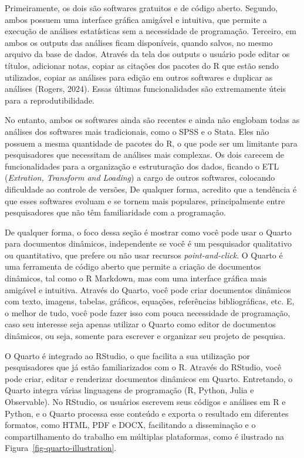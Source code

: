 \documentclass[
  a4paper,
]{article}
\begin{document}
Primeiramente, os dois são softwares gratuitos e de código aberto.
Segundo, ambos possuem uma interface gráfica amigável e intuitiva, que
permite a execução de análises estatísticas sem a necessidade de
programação. Terceiro, em ambos os outputs das análises ficam
disponíveis, quando salvos, no mesmo arquivo da base de dados. Através
da tela dos outputs o usuário pode editar os títulos, adicionar notas,
copiar as citações dos pacotes do R que estão sendo utilizados, copiar
as análises para edição em outros softwares e duplicar as análises
(Rogers, 2024). Essas últimas funcionalidades são extremamente úteis
para a reprodutibilidade.

No entanto, ambos os softwares ainda são recentes e ainda não englobam
todas as análises dos softwares mais tradicionais, como o SPSS e o
Stata. Eles não possuem a mesma quantidade de pacotes do R, o que pode
ser um limitante para pesquisadores que necessitam de análises mais
complexas. Os dois carecem de funcionalidades para a organização e
estruturação dos dados, ficando o ETL (\emph{Extration, Transform and
Loading}) a cargo de outros softwares, colocando dificuldade ao controle
de versões, De qualquer forma, acredito que a tendência é que esses
softwares evoluam e se tornem mais populares, principalmente entre
pesquisadores que não têm familiaridade com a programação.

De qualquer forma, o foco dessa seção é mostrar como você pode usar o
Quarto para documentos dinâmicos, independente se você é um pesquisador
qualitativo ou quantitativo, que prefere ou não usar recursos
\emph{point-and-click}. O Quarto é uma ferramenta de código aberto que
permite a criação de documentos dinâmicos, tal como o R Markdown, mas
com uma interface gráfica mais amigável e intuitiva. Através do Quarto,
você pode criar documentos dinâmicos com texto, imagens, tabelas,
gráficos, equações, referências bibliográficas, etc. E, o melhor de
tudo, você pode fazer isso com pouca necessidade de programação, caso
seu interesse seja apenas utilizar o Quarto como editor de documentos
dinâmicos, ou seja, somente para escrever e organizar seu projeto de
pesquisa.

O Quarto é integrado ao RStudio, o que facilita a sua utilização por
pesquisadores que já estão familiarizados com o R. Através do RStudio,
você pode criar, editar e renderizar documentos dinâmicos em Quarto.
Entretando, o Quarto integra várias linguagens de programação (R,
Python, Julia e Observable). No RStudio, os usuários escrevem seus
códigos e análises em R e Python, e o Quarto processa esse conteúdo e
exporta o resultado em diferentes formatos, como HTML, PDF e DOCX,
facilitando a disseminação e o compartilhamento do trabalho em múltiplas
plataformas, como é ilustrado na Figura~\ref{fig-quarto-illustration}.
\end{document}
